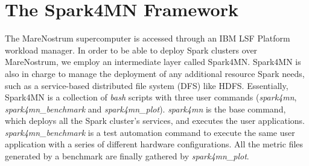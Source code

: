 \documentclass[journal]{IEEEtran}
\begin{document}
\section{The Spark4MN Framework}
\label{sec:spark4mn}
The MareNostrum supercomputer is accessed through an IBM LSF Platform workload manager. In order to be able to deploy Spark clusters over MareNostrum, we employ an intermediate layer called Spark4MN. Spark4MN is also in charge to manage the deployment of any additional resource Spark needs, such as a service-based distributed file system (DFS) like HDFS.
Essentially, Spark4MN is a collection of {\it bash} scripts with three user commands ({\it spark4mn}, {\it spark4mn\_benchmark} and {\it spark4mn\_plot}). {\it spark4mn} is the base command, which deploys all the Spark
cluster's services, and executes the user applications. {\it spark4mn\_benchmark} is a test automation command to execute the same user application with a series of different hardware configurations. All the metric files generated by a benchmark are finally gathered by {\it spark4mn\_plot}.

\end{document}
